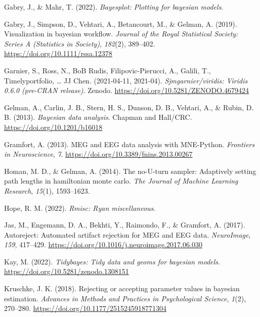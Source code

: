 \documentclass[
  man,floatsintext]{apa6}
\newlength{\cslhangindent}
\newlength{\cslentryspacingunit} %
\newenvironment{CSLReferences}[2] %
 {%
  \setlength{\parindent}{0pt}
  \ifodd #1
  \let\oldpar\par
  \def\par{\hangindent=\cslhangindent\oldpar}
  \fi
  \setlength{\parskip}{#2\cslentryspacingunit}
 }%
 {}
\begin{document}
\begin{CSLReferences}{1}{0}
\leavevmode{}%
Gabry, J., \& Mahr, T. (2022). \emph{Bayesplot: {Plotting} for bayesian models}.

\leavevmode{}%
Gabry, J., Simpson, D., Vehtari, A., Betancourt, M., \& Gelman, A. (2019). Visualization in bayesian workflow. \emph{Journal of the Royal Statistical Society: Series A (Statistics in Society)}, \emph{182}(2), 389--402. \url{https://doi.org/10.1111/rssa.12378}

\leavevmode{}%
Garnier, S., Ross, N., BoB Rudis, Filipovic-Pierucci, A., Galili, T., Timelyportfolio, \ldots{} JJ Chen. (2021-04-11, 2021-04). \emph{Sjmgarnier/viridis: Viridis 0.6.0 (pre-{CRAN} release)}. {Zenodo}. \url{https://doi.org/10.5281/ZENODO.4679424}

\leavevmode{}%
Gelman, A., Carlin, J. B., Stern, H. S., Dunson, D. B., Vehtari, A., \& Rubin, D. B. (2013). \emph{Bayesian data analysis}. {Chapman and Hall/CRC}. \url{https://doi.org/10.1201/b16018}

\leavevmode{}%
Gramfort, A. (2013). {MEG} and {EEG} data analysis with {MNE-Python}. \emph{Frontiers in Neuroscience}, \emph{7}. \url{https://doi.org/10.3389/fnins.2013.00267}

\leavevmode{}%
Homan, M. D., \& Gelman, A. (2014). The no-{U-turn} sampler: {Adaptively} setting path lengths in hamiltonian monte carlo. \emph{The Journal of Machine Learning Research}, \emph{15}(1), 1593--1623.

\leavevmode{}%
Hope, R. M. (2022). \emph{Rmisc: {Ryan} miscellaneous}.

\leavevmode{}%
Jas, M., Engemann, D. A., Bekhti, Y., Raimondo, F., \& Gramfort, A. (2017). Autoreject: {Automated} artifact rejection for {MEG} and {EEG} data. \emph{NeuroImage}, \emph{159}, 417--429. \url{https://doi.org/10.1016/j.neuroimage.2017.06.030}

\leavevmode{}%
Kay, M. (2022). \emph{Tidybayes: {Tidy} data and geoms for bayesian models}. \url{https://doi.org/10.5281/zenodo.1308151}

\leavevmode{}%
Kruschke, J. K. (2018). Rejecting or accepting parameter values in bayesian estimation. \emph{Advances in Methods and Practices in Psychological Science}, \emph{1}(2), 270--280. \url{https://doi.org/10.1177/2515245918771304}


\end{CSLReferences}
\end{document}
